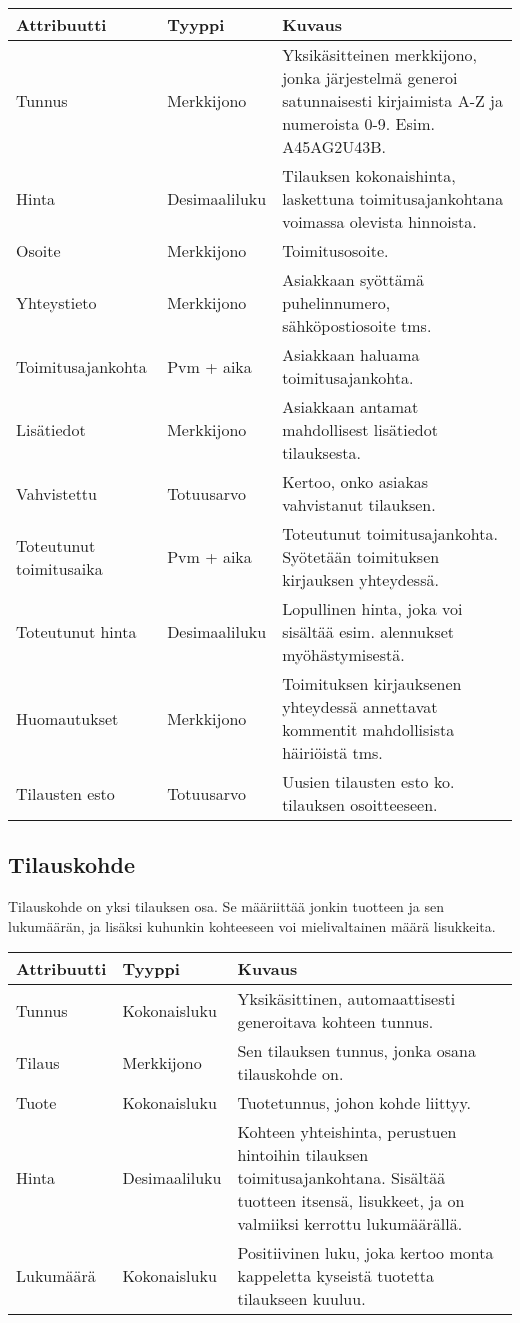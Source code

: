 \documentclass[a4paper, 12pt, finnish]{article}
\begin{document}
\vspace{0.5cm}\hspace{-1cm}
\begin{tabular}{l l p{7cm}}
\textbf{Attribuutti} & \textbf{Tyyppi} & \textbf{Kuvaus} \\
\hline
Tunnus & Merkkijono & Yksikäsitteinen merkkijono, jonka järjestelmä generoi satunnaisesti kirjaimista A-Z ja numeroista 0-9. Esim. A45AG2U43B.  \\ 
Hinta & Desimaaliluku & Tilauksen kokonaishinta, laskettuna toimitusajankohtana voimassa olevista hinnoista. \\
Osoite & Merkkijono & Toimitusosoite. \\
Yhteystieto & Merkkijono & Asiakkaan syöttämä puhelinnumero, sähköpostiosoite tms. \\
Toimitusajankohta & Pvm + aika & Asiakkaan haluama toimitusajankohta. \\
Lisätiedot & Merkkijono & Asiakkaan antamat mahdollisest lisätiedot tilauksesta. \\
Vahvistettu & Totuusarvo & Kertoo, onko asiakas vahvistanut tilauksen. \\
Toteutunut toimitusaika & Pvm + aika & Toteutunut toimitusajankohta. Syötetään toimituksen kirjauksen yhteydessä. \\
Toteutunut hinta & Desimaaliluku & Lopullinen hinta, joka voi sisältää esim. alennukset myöhästymisestä. \\
Huomautukset & Merkkijono & Toimituksen kirjauksenen yhteydessä annettavat kommentit mahdollisista häiriöistä tms. \\
Tilausten esto & Totuusarvo & Uusien tilausten esto ko. tilauksen osoitteeseen. \\
\end{tabular}

\subsection*{Tilauskohde}
Tilauskohde on yksi tilauksen osa. Se määriittää jonkin tuotteen ja sen lukumäärän, ja lisäksi kuhunkin kohteeseen voi mielivaltainen määrä lisukkeita.

\vspace{0.5cm}\hspace{-1cm}
\begin{tabular}{l l p{7cm}}
\textbf{Attribuutti} & \textbf{Tyyppi} & \textbf{Kuvaus} \\
\hline
Tunnus & Kokonaisluku & Yksikäsittinen, automaattisesti generoitava kohteen tunnus. \\
Tilaus & Merkkijono & Sen tilauksen tunnus, jonka osana tilauskohde on. \\
Tuote & Kokonaisluku & Tuotetunnus, johon kohde liittyy. \\
Hinta & Desimaaliluku & Kohteen yhteishinta, perustuen hintoihin tilauksen toimitusajankohtana. Sisältää tuotteen itsensä, lisukkeet, ja on valmiiksi kerrottu lukumäärällä. \\
Lukumäärä & Kokonaisluku & Positiivinen luku, joka kertoo monta kappeletta kyseistä tuotetta tilaukseen kuuluu. \\
\end{tabular}
\end{document}
